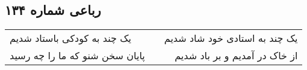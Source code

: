\begin{center}
\section*{رباعی شماره ۱۳۴}
\label{sec:sh134}
\begin{longtable}{l p{0.5cm} r}
یک چند به کودکی باستاد شدیم
&&
یک چند به استادی خود شاد شدیم
\\
پایان سخن شنو که ما را چه رسید
&&
از خاک در آمدیم و بر باد شدیم
\\
\end{longtable}
\end{center}
